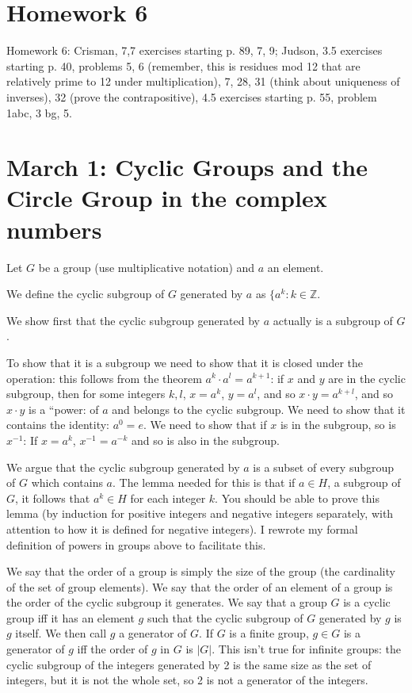 \documentclass[12pt]{article}
\begin{document}
\newpage

\section{Homework 6}

Homework 6:  Crisman, 7,7 exercises starting p. 89, 7, 9;  Judson, 3.5 exercises starting p. 40, problems 5, 6 (remember, this is residues mod 12 that are relatively prime to 12 under multiplication), 7, 28, 31 (think about uniqueness of inverses), 32 (prove the contrapositive), 4.5 exercises starting p. 55, problem 1abc, 3 bg, 5.

\section{March 1:  Cyclic Groups and the Circle Group in the complex numbers}

Let $G$ be a group (use multiplicative notation) and $a$ an element.  

We define the cyclic subgroup of $G$ generated by $a$ as $\{a^k:k \in {\mathbb Z}$.

We show first that the cyclic subgroup generated by $a$ actually is a subgroup of $G$.

To show that it is a subgroup we need to show that it is closed under the operation:  this follows from the theorem $a^k \cdot a^l = a^{k+1}$:  if $x$ and $y$ are in the cyclic subgroup, then for some integers $k,l$, $x=a^k$, $y=a^l$, and so $x\cdot y = a^{k+l}$, and so $x\cdot y$ is a ``power: of $a$ and belongs to the cyclic subgroup.   We need to show that it contains the identity:  $a^0 = e$.  We need to show that if $x$ is in the subgroup, so is $x^{-1}$:  If $x=a^k$, $x^{-1} = a^{-k}$ and so is also in the subgroup.

We argue that the cyclic subgroup generated by $a$ is a subset of every subgroup of $G$ which contains $a$.  The lemma needed for this is that if $a \in H$, a subgroup of $G$, it follows that $a^k \in H$ for each integer $k$.  You should be able to prove this lemma (by induction for positive integers and negative integers separately, with attention to how it is defined for negative integers).  I rewrote my formal definition of powers in groups above to facilitate this.

We say that the order of a group is simply the size of the group (the cardinality of the set of group elements).  We say that the order of an element of a group is the order of the cyclic subgroup it generates.  We say that a group $G$ is a cyclic group iff it has an element $g$ such that the cyclic subgroup of $G$ generated by $g$ is $g$ itself.  We then call $g$ a generator of $G$.  If $G$ is a finite group, $g \in G$ is a generator of $g$ iff the order of $g$ in $G$ is $|G|$.  This isn't true for infinite groups:  the cyclic subgroup of the integers generated by 2 is the same size as the set of integers, but it is not the whole set, so 2 is not a generator of the integers.
\end{document}
